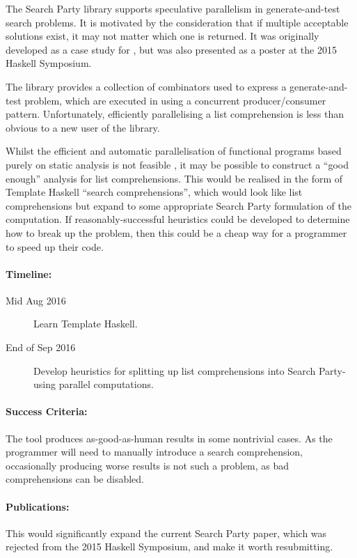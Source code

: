 The Search Party library supports speculative parallelism in
generate-and-test search problems. It is motivated by the
consideration that if multiple acceptable solutions exist, it may not
matter which one is returned. It was originally developed as a case
study for \dejafu{}, but was also presented as a poster at the 2015
Haskell Symposium.

The library provides a collection of combinators used to express a
generate-and-test problem, which are executed in using a concurrent
producer/consumer pattern. Unfortunately, efficiently parallelising a
list comprehension is less than obvious to a new user of the library.

Whilst the efficient and automatic parallelisation of functional
programs based purely on static analysis is not feasible
\citep{autopar}, it may be possible to construct a ``good enough''
analysis for list comprehensions. This would be realised in the form
of Template Haskell ``search comprehensions'', which would look like
list comprehensions but expand to some appropriate Search Party
formulation of the computation. If reasonably-successful heuristics
could be developed to determine how to break up the problem, then this
could be a cheap way for a programmer to speed up their code.

\paragraph{Timeline:}

\begin{description}
\item[Mid Aug 2016] Learn Template Haskell.

\item[End of Sep 2016] Develop heuristics for splitting up list
  comprehensions into Search Party-using parallel computations.
\end{description}

\paragraph{Success Criteria:}

The tool produces as-good-as-human results in some nontrivial
cases. As the programmer will need to manually introduce a search
comprehension, occasionally producing worse results is not such a
problem, as bad comprehensions can be disabled.

\paragraph{Publications:}

This would significantly expand the current Search Party paper, which
was rejected from the 2015 Haskell Symposium, and make it worth
resubmitting.
